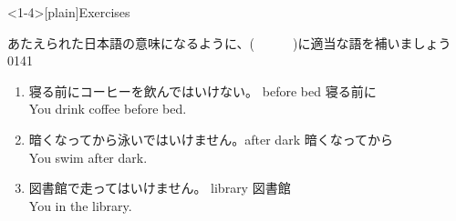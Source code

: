 \documentclass[aspectratio=169,xcolor={dvipsnames,table}]{beamer}
\newcommand{\myaudio}[1]{\href{#1}{\faVolumeUp}}
\begin{document}
\begin{frame}<1-4>[plain]{Exercises}
 
あたえられた日本語の意味になるように、(~~~~~~)に適当な語を補いましょう
\hfill{\tiny 0141}\,{\scriptsize \myaudio{./audio/013_must_05.mp3}}


\begin{enumerate}
 \item {\small 寝る前にコーヒーを飲んではいけない。}%
\hfill{}{\scriptsize before bed 寝る前に}\\
You  drink coffee before bed.
 \item {\small 暗くなってから泳いではいけません。}\hfill{}{\scriptsize after dark 暗くなってから}\\
 You  swim after dark.
 \item {\small 図書館で走ってはいけません。}%
\hfill{}{\scriptsize library  図書館}\\
 You   in the library.
\end{enumerate}
\end{frame}

\end{document}
